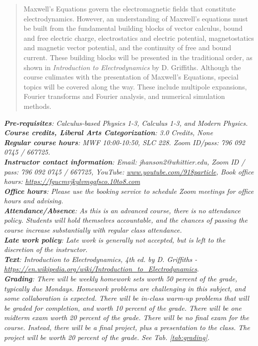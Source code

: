 \documentclass[10pt]{article}
\begin{document}
\maketitle

\begin{abstract}
Maxwell's Equations govern the electromagnetic fields that constitute electrodynamics.  However, an understanding of Maxwell's equations must be built from the fundamental building blocks of vector calculus, bound and free electric charge, electrostatics and electric potential, magnetostatics and magnetic vector potential, and the continuity of free and bound current.  These building blocks will be presented in the traditional order, as shown in \textit{Introduction to Electrodynamics} by D. Griffiths.  Although the course culimates with the presentation of Maxwell's Equations, special topics will be covered along the way.  These include multipole expansions, Fourier transforms and Fourier analysis, and numerical simulation methods.  
\end{abstract}
\noindent
\textit{\textbf{Pre-requisites}:  Calculus-based Physics 1-3, Calculus 1-3, and Modern Physics.} \\
\textit{\textbf{Course credits, Liberal Arts Categorization}: 3.0 Credits, None} \\
\textit{\textbf{Regular course hours}: MWF 10:00-10:50, SLC 228.  \textit{Zoom ID/pass}: 796 092 0745 / 667725. } \\
\textit{\textbf{Instructor contact information}: Email: jhanson2@whittier.edu, Zoom ID / pass: 796 092 0745 / 667725, YouTube: \url{www.youtube.com/918particle}, Book office hours: \url{https://fgucmvjkylvmgqfsco.10to8.com}} \\
\textit{\textbf{Office hours}: Please use the booking service to schedule Zoom meetings for office hours and advising.} \\
\textit{\textbf{Attendance/Absence}: As this is an advanced course, there is no attendance policy. Students will hold themselves accountable, and the chances of passing the course increase substantially with regular class attendance.} \\ 
\textit{\textbf{Late work policy}: Late work is generally not accepted, but is left to the discretion of the instructor.} \\
\textit{\textbf{Text}: Introduction to Electrodynamics, 4th ed. by D. Griffiths - \url{https://en.wikipedia.org/wiki/Introduction_to_Electrodynamics}}. \\
\textit{\textbf{Grading}: There will be weekly homework sets worth 50 percent of the grade, typically due Mondays.  Homework problems are challenging in this subject, and some collaboration is expected.  There will be in-class warm-up problems that will be graded for completion, and worth 10 percent of the grade.  There will be one midterm exam worth 20 percent of the grade.  There will be no final exam for the course.  Instead, there will be a final project, plus a presentation to the class.  The project will be worth 20 percent of the grade.  See Tab. \ref{tab:grading}.}
\end{document}
